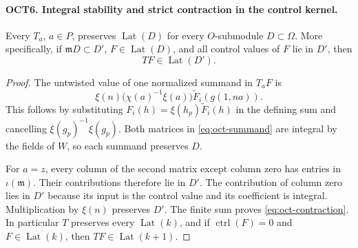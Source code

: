 \paragraph{OCT6. Integral stability and strict contraction in the control kernel.}
\label{claim:OCT6}
Every $T_a$, $a\in P$, preserves $\operatorname{Lat}(D)$ for
every $O$-submodule $D\subset\Omega$.  More specifically, if
$\mathfrak m D\subset D'$, $F\in\operatorname{Lat}(D)$, and
all control values of $F$ lie in $D'$, then
\begin{equation}\label{eq:oct-contraction}
                         TF\in\operatorname{Lat}(D').
\end{equation}
\begin{proof}
The untwisted value of one normalized summand in $T_aF$ is
\begin{equation}\label{eq:oct-summand}
 \xi(n)\bigl(\chi(a)^{-1}\xi(a)\bigr)
                         \widetilde F_i(g(1,na)).
\end{equation}
This follows by substituting
$F_i(h)=\xi(h_p)\widetilde F_i(h)$ in the defining sum and
cancelling $\xi(g_p)^{-1}\xi(g_p)$.  Both matrices in
\eqref{eq:oct-summand} are integral by the fields of $W$, so
each summand preserves $D$.

For $a=z$, every column of the second matrix except column
zero has entries in $\iota(\mathfrak m)$.  Their contributions
therefore lie in $D'$.  The contribution of column zero lies
in $D'$ because its input is the control value and its
coefficient is integral.  Multiplication by $\xi(n)$ preserves
$D'$.  The finite sum proves \eqref{eq:oct-contraction}.
In particular $T$ preserves every $\operatorname{Lat}(k)$, and
if $\operatorname{ctrl}(F)=0$ and
$F\in\operatorname{Lat}(k)$, then
$TF\in\operatorname{Lat}(k+1)$.
\end{proof}

